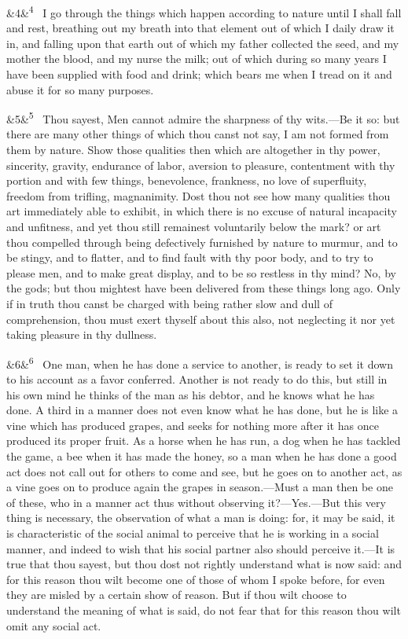 \documentclass[12pt]{article}
\newcommand{\para}[1][]{\par\noindent\ifx&#1&\else\textsuperscript{\footnotesize #1}~\fi}
\begin{document}
\para[4] I go through the things which happen according to nature until I
shall fall and rest, breathing out my breath into that element out of
which I daily draw it in, and falling upon that earth out of which my
father collected the seed, and my mother the blood, and my nurse the
milk; out of which during so many years I have been supplied with food
and drink; which bears me when I tread on it and abuse it for so many
purposes.

\para[5] Thou sayest, Men cannot admire the sharpness of thy wits.---Be it so:
but there are many other things of which thou canst not say, I am not
formed from them by nature. Show those qualities then which are
altogether in thy power, sincerity, gravity, endurance of labor,
aversion to pleasure, contentment with thy portion and with few things,
benevolence, frankness, no love of superfluity, freedom from trifling,
magnanimity. Dost thou not see how many qualities thou art immediately
able to exhibit, in which there is no excuse of natural incapacity and
unfitness, and yet thou still remainest voluntarily below the mark? or
art thou compelled through being defectively furnished by nature to
murmur, and to be stingy, and to flatter, and to find fault with thy
poor body, and to try to please men, and to make great display, and to
be so restless in thy mind? No, by the gods; but thou mightest have been
delivered from these things long ago. Only if in truth thou canst be
charged with being rather slow and dull of comprehension, thou must
exert thyself about this also, not neglecting it nor yet taking pleasure
in thy dullness.

\para[6] One man, when he has done a service to another, is ready to set it
down to his account as a favor conferred. Another is not ready to do
this, but still in his own mind he thinks of the man as his debtor, and
he knows what he has done. A third in a manner does not even know what
he has done, but he is like a vine which has produced grapes, and seeks
for nothing more after it has once produced its proper fruit. As a horse
when he has run, a dog when he has tackled the game, a bee when it has
made the honey, so a man when he has done a good act does not call out
for others to come and see, but he goes on to another act, as a vine
goes on to produce again the grapes in season.---Must a man then be one
of these, who in a manner act thus without observing it?---Yes.---But this
very thing is necessary, the observation of what a man is doing: for, it
may be said, it is characteristic of the social animal to perceive that
he is working in a social manner, and indeed to wish that his social
partner also should perceive it.---It is true that thou sayest, but thou
dost not rightly understand what is now said: and for this reason thou
wilt become one of those of whom I spoke before, for even they are
misled by a certain show of reason. But if thou wilt choose to
understand the meaning of what is said, do not fear that for this reason
thou wilt omit any social act.
\end{document}
